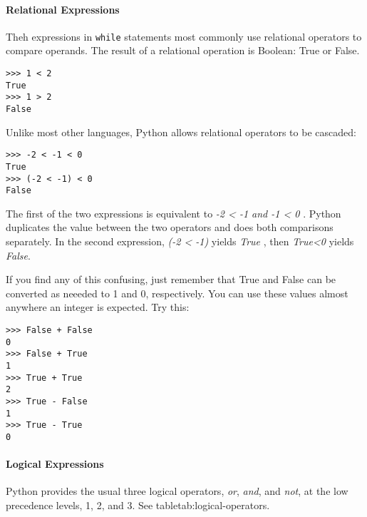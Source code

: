 \paragraph{Relational Expressions}\label{relational-expressions}

Theh expressions in \texttt{while} statements most commonly use relational operators to compare operands.
The result of a relational operation is Boolean: True or False.

\begin{verbatim}
>>> 1 < 2
True
>>> 1 > 2
False
\end{verbatim}

Unlike most other languages, Python
allows relational operators to be cascaded:

\begin{verbatim}
>>> -2 < -1 < 0
True
>>> (-2 < -1) < 0
False
\end{verbatim}

The first of the two expressions is
equivalent to \emph{-2 \textless{} -1 and -1 \textless{} 0} . Python
duplicates the value between the two operators and does both comparisons
separately. In the second expression, \emph{(-2 \textless{} -1)} yields
\emph{True} , then \emph{True\textless{}0} yields \emph{False}.

If you find any of this confusing, just remember that True and False can
be converted as neeeded to 1 and 0, respectively. You can use these values
almost anywhere an integer is expected. Try this:

\begin{verbatim}
>>> False + False
0
>>> False + True
1
>>> True + True
2
>>> True - False
1
>>> True - True
0

\end{verbatim}

\paragraph{Logical Expressions}
\label{logical-expressions}

Python provides the usual three logical operators, \emph{or}, \emph{and}, and \emph{not}, at the low 
precedence levels, 1, 2, and 3. See table{tab:logical-operators}.

